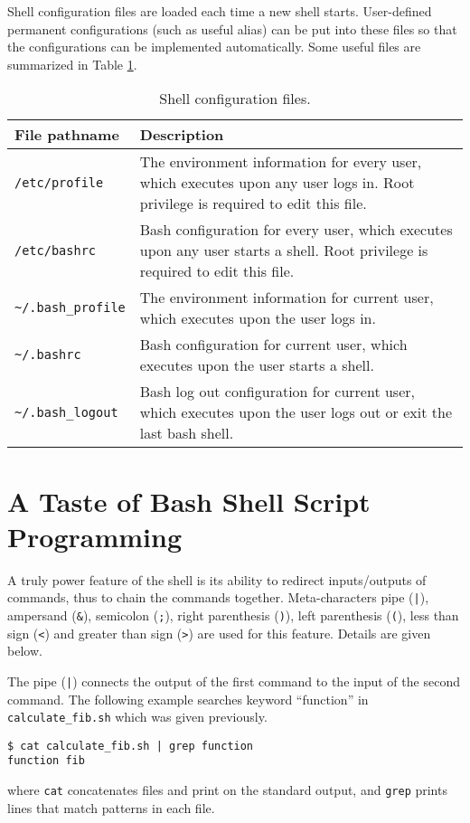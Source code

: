 Shell configuration files are loaded each time a new shell starts. User-defined permanent configurations (such as useful alias) can be put into these files so that the configurations can be implemented automatically. Some useful files are summarized in Table \ref{ch2tab:shellconfig}.

\begin{table}
	\centering \caption{Shell configuration files.}\label{ch2tab:shellconfig}
	\begin{tabularx}{\textwidth}{lX}
		\hline
		File pathname & Description \\ \hline
		\verb|/etc/profile| & The environment information for every user, which executes upon any user logs in. Root privilege is required to edit this file.  \\ \hdashline
		\verb|/etc/bashrc| & Bash configuration for every user, which executes upon any user starts a shell. Root privilege is required to edit this file. \\ \hdashline
		\verb|~/.bash_profile| & The environment information for current user, which executes upon the user logs in. \\ \hdashline
		\verb|~/.bashrc| & Bash configuration for current user, which executes upon the user starts a shell. \\ \hdashline
		\verb|~/.bash_logout| & Bash log out configuration for current user, which executes upon the user logs out or exit the last bash shell. \\ \hline
	\end{tabularx}
\end{table}

\section{A Taste of Bash Shell Script Programming}

A truly power feature of the shell is its ability to redirect inputs/outputs of commands, thus to chain the commands together. Meta-characters pipe (\verb$|$), ampersand (\verb|&|), semicolon (\verb|;|), right parenthesis (\verb|)|), left parenthesis (\verb|(|), less than sign (\verb|<|) and greater than sign (\verb|>|) are used for this feature. Details are given below.

The pipe (\verb$|$) connects the output of the first command to the input of the second command. The following example searches keyword ``function'' in \verb|calculate_fib.sh| which was given previously.
\begin{lstlisting}
$ cat calculate_fib.sh | grep function
function fib
\end{lstlisting}
where \verb|cat| concatenates files and print on the standard output, and \verb|grep| prints lines that match patterns in each file.

